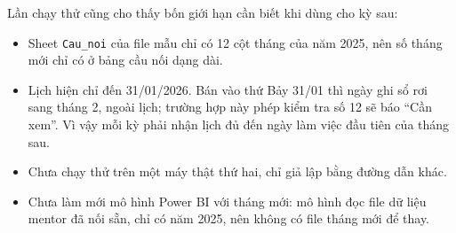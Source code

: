 Lần chạy thử cũng cho thấy bốn giới hạn cần biết khi dùng cho kỳ sau:
\begin{itemize}
  \item Sheet \texttt{Cau\_noi} của file mẫu chỉ có 12 cột tháng của năm 2025, nên số tháng mới chỉ có ở bảng cầu nối dạng dài.
  \item Lịch hiện chỉ đến 31/01/2026. Bán vào thứ Bảy 31/01 thì ngày ghi sổ rơi sang tháng 2, ngoài lịch; trường hợp này phép kiểm tra số 12 sẽ báo ``Cần xem''. Vì vậy mỗi kỳ phải nhận lịch đủ đến ngày làm việc đầu tiên của tháng sau.
  \item Chưa chạy thử trên một máy thật thứ hai, chỉ giả lập bằng đường dẫn khác.
  \item Chưa làm mới mô hình Power BI với tháng mới: mô hình đọc file dữ liệu mentor đã nối sẵn, chỉ có năm 2025, nên không có file tháng mới để thay.
\end{itemize}
